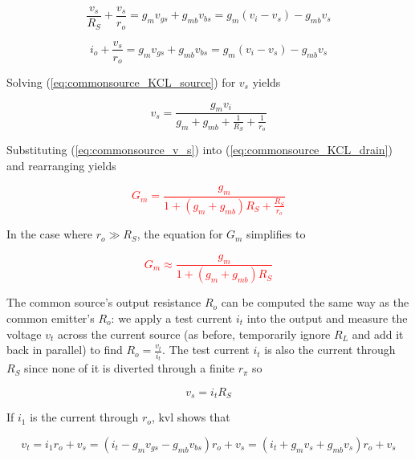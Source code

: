 \begin{equation}
\frac{v_{s}}{R_{S}} + \frac{v_{s}}{r_{o}} = g_{m}v_{gs} + g_{mb}v_{bs} = g_{m}(v_{i}-v_{s}) - g_{mb}v_{s}
\label{eq:commonsource_KCL_source}
\end{equation}

\begin{equation}
i_{o} + \frac{v_{s}}{r_{o}} = g_{m}v_{gs} + g_{mb}v_{bs} = g_{m}(v_{i}-v_{s}) - g_{mb}v_{s}
\label{eq:commonsource_KCL_drain}
\end{equation}

Solving (\ref{eq:commonsource_KCL_source}) for $v_{s}$ yields

\begin{equation}
v_{s} = \frac{g_{m}v_{i}}{g_{m}+g_{mb}+\frac{1}{R_{S}}+\frac{1}{r_{o}}}
\label{eq:commonsource_v_s}
\end{equation}

Substituting (\ref{eq:commonsource_v_s}) into (\ref{eq:commonsource_KCL_drain}) and rearranging yields \autocite[201]{analysis-design-analog-ics}

\textcolor{red}{
\begin{equation}
G_{m} = \frac{g_{m}}{1+(g_{m}+g_{mb})R_{S}+\frac{R_{S}}{r_{o}}}
\end{equation}
}

In the case where $r_{o} \gg R_{S}$, the equation for $G_{m}$ simplifies to

\textcolor{red}{
\begin{equation}
G_{m} \approx \frac{g_m}{1+(g_m + g_{mb})R_S}
\end{equation}
}

The common source's output resistance $R_{o}$ can be computed the same way as the common emitter's $R_{o}$: we apply a test current $i_{t}$ into the output and measure the voltage $v_{t}$ across the current source (as before, temporarily ignore $R_{L}$ and add it back in parallel) to find $R_{o} = \frac{v_{t}}{i_{t}}$.
The test current $i_{t}$ is also the current through $R_{S}$ since none of it is diverted through a finite $r_{\pi}$ so

\begin{equation}
v_{s} = i_{t}R_{S}
\label{eq:commonsource_Ro_v_s}
\end{equation}

If $i_{1}$ is the current through $r_{o}$, \ac{kvl} shows that

\begin{equation}
v_{t} = i_{1}r_{o}+v_{s} = (i_{t}-g_{m}v_{gs}-g_{mb}v_{bs})r_{o}+v_{s} = (i_{t}+g_{m}v_{s}+g_{mb}v_{s})r_{o}+v_{s}
\label{eq:commonsource_Ro_v_t}
\end{equation}

